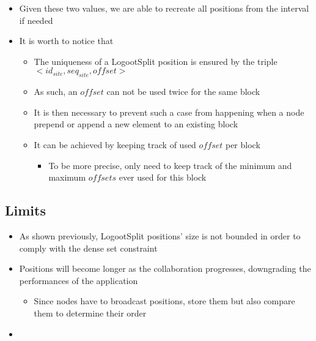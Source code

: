 \documentclass{article}
\begin{document}
\begin{itemize}
    \item Given these two values, we are able to recreate all positions from the interval if needed
    \item It is worth to notice that
    \begin{itemize}
        \item The uniqueness of a LogootSplit position is ensured by the triple $<id_{site}, seq_{site}, offset>$
        \item As such, an $offset$ can not be used twice for the same block
        \item It is then necessary to prevent such a case from happening when a node prepend or append a new element to an existing block
        \item It can be achieved by keeping track of used $offset$ per block
        \begin{itemize}
            \item To be more precise, only need to keep track of the minimum and maximum $offsets$ ever used for this block
        \end{itemize}
    \end{itemize}
\end{itemize}

\subsection{Limits}

\begin{itemize}
    \item As shown previously, LogootSplit positions' size is not bounded in order to comply with the dense set constraint
    \item Positions will become longer as the collaboration progresses, downgrading the performances of the application 
    \begin{itemize}
        \item Since nodes have to broadcast positions, store them but also compare them to determine their order
    \end{itemize}
    \item {}
\end{itemize}
\end{document}

